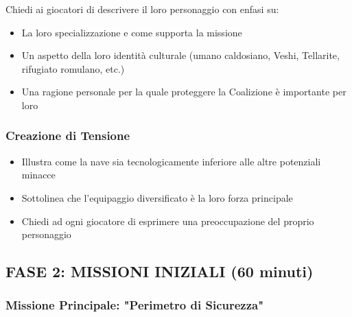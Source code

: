 \documentclass[letterpaper,twocolumn,openany,nodeprecatedcode]{dndbook}
\begin{document}
Chiedi ai giocatori di descrivere il loro personaggio con enfasi su:

\begin{itemize}
    \item La loro specializzazione e come supporta la missione
    \item Un aspetto della loro identità culturale (umano caldosiano, Veshi, Tellarite, rifugiato romulano, etc.)
    \item Una ragione personale per la quale proteggere la Coalizione è importante per loro
\end{itemize}



\subsubsection{Creazione di Tensione}

\begin{itemize}
    \item Illustra come la nave sia tecnologicamente inferiore alle altre potenziali minacce
    \item Sottolinea che l'equipaggio diversificato è la loro forza principale
    \item Chiedi ad ogni giocatore di esprimere una preoccupazione del proprio personaggio
\end{itemize}

\subsection{FASE 2: MISSIONI INIZIALI (60 minuti)}
\subsubsection{Missione Principale: "Perimetro di Sicurezza"}
\end{document}
